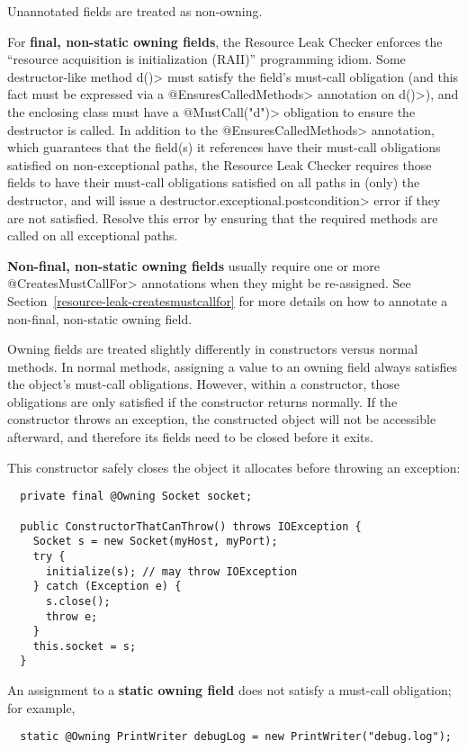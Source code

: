 Unannotated fields are treated as non-owning.

For \textbf{final, non-static owning fields},
the Resource Leak Checker enforces the ``resource acquisition is
initialization (RAII)'' programming idiom.  Some
destructor-like method \<d()> must satisfy the field's must-call obligation
(and this fact must be expressed via a \<@EnsuresCalledMethods> annotation on \<d()>),
and the enclosing class must have a \<@MustCall("d")> obligation to
ensure the destructor is called. In addition to the \<@EnsuresCalledMethods> annotation,
which guarantees that the field(s) it references have their must-call obligations satisfied
on non-exceptional paths, the Resource Leak Checker requires those fields to have their must-call
obligations satisfied on all paths in (only) the destructor, and will issue a \<destructor.exceptional.postcondition>
error if they are not satisfied. Resolve this error by ensuring that the required methods are called
on all exceptional paths.

\textbf{Non-final, non-static owning fields} usually require one or more \<@CreatesMustCallFor> annotations
when they might be re-assigned. See Section~\ref{resource-leak-createsmustcallfor} for
more details on how to annotate a non-final, non-static owning field.

Owning fields are treated slightly differently in constructors versus normal methods.
In normal methods, assigning a value to an owning field always satisfies the object's
must-call obligations.  However, within a constructor, those obligations are only
satisfied if the constructor returns normally.  If the constructor throws an exception,
the constructed object will not be accessible afterward, and therefore its fields need
to be closed before it exits.

This constructor safely closes the object it allocates before throwing an exception:
\begin{verbatim}
  private final @Owning Socket socket;

  public ConstructorThatCanThrow() throws IOException {
    Socket s = new Socket(myHost, myPort);
    try {
      initialize(s); // may throw IOException
    } catch (Exception e) {
      s.close();
      throw e;
    }
    this.socket = s;
  }
\end{verbatim}

An assignment to a \textbf{static owning field} does not satisfy a
must-call obligation; for example,

\begin{smaller}
\begin{Verbatim}
  static @Owning PrintWriter debugLog = new PrintWriter("debug.log");
\end{Verbatim}
\end{smaller}

